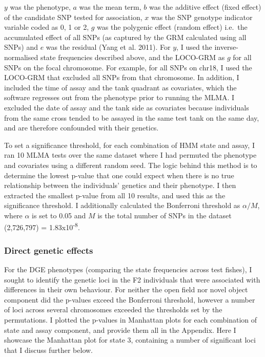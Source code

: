 \documentclass[
]{book}
\begin{document}
\(y\) was the phenotype, \(a\) was the mean term, \(b\) was the additive effect (fixed effect) of the candidate SNP tested for association, \(x\) was the SNP genotype indicator variable coded as 0, 1 or 2, \(g\) was the polygenic effect (random effect) i.e.~the accumulated effect of all SNPs (as captured by the GRM calculated using all SNPs) and \(e\) was the residual (Yang et al. 2011). For \(y\), I used the inverse-normalised state frequencies described above, and the LOCO-GRM as \(g\) for all SNPs on the focal chromosome. For example, for all SNPs on chr18, I used the LOCO-GRM that excluded all SNPs from that chromosome. In addition, I included the time of assay and the tank quadrant as covariates, which the software regresses out from the phenotype prior to running the MLMA. I excluded the date of assay and the tank side as covariates because individuals from the same cross tended to be assayed in the same test tank on the same day, and are therefore confounded with their genetics.

To set a significance threshold, for each combination of HMM state and assay, I ran 10 MLMA tests over the same dataset where I had permuted the phenotype and covariates using a different random seed. The logic behind this method is to determine the lowest p-value that one could expect when there is no true relationship between the individuals' genetics and their phenotype. I then extracted the smallest p-value from all 10 results, and used this as the significance threshold. I additionally calculated the Bonferroni threshold as \(\alpha / M\), where \(\alpha\) is set to 0.05 and \(M\) is the total number of SNPs in the dataset (2,726,797) = 1.83x10\textsuperscript{-8}.

\hypertarget{direct-genetic-effects-2}{%
\subsubsection{Direct genetic effects}\label{direct-genetic-effects-2}}

For the DGE phenotypes (comparing the state frequencies across test fishes), I sought to identify the genetic loci in the F2 individuals that were associated with differences in their own behaviour. For neither the open field nor novel object component did the p-values exceed the Bonferroni threshold, however a number of loci across several chromosomes exceeded the thresholds set by the permutations. I plotted the p-values in Manhattan plots for each combination of state and assay component, and provide them all in the Appendix. Here I showcase the Manhattan plot for state 3, containing a number of significant loci that I discuss further below.
\end{document}
